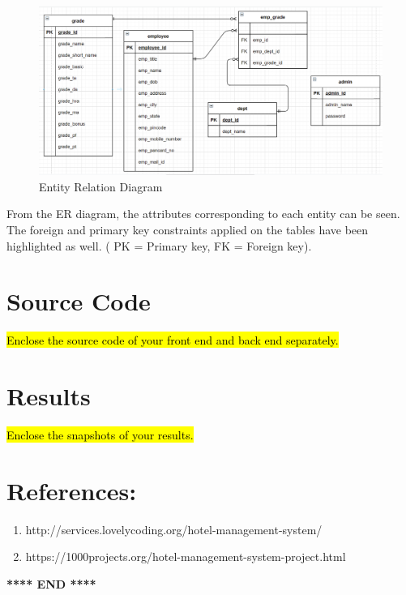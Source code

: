 \documentclass[12pt]{article}
\begin{document}
\begin{figure}[h!]
    \centering
    \includegraphics[width = \columnwidth]{er_diagram.png}
    \caption{Entity Relation Diagram}
    \label{fig:my_label}
\end{figure}
\noindent
From the ER diagram, the attributes corresponding to each entity can be seen. The foreign and primary key constraints applied on the tables have been highlighted as well. ( PK = Primary key, FK = Foreign key).


\newpage                            %
\section{Source Code}               %

\hl{Enclose the source code of your front end and back end separately.}

\newpage            %
\section{Results}   %

\hl{Enclose the snapshots of your results.}

\begin{figure}[h!]
    \centering
\end{figure}

\newpage
\section{References:}
\begin{enumerate}
    \item http://services.lovelycoding.org/hotel-management-system/
    \item https://1000projects.org/hotel-management-system-project.html
\end{enumerate}


\begin{center}
    \textbf{**** END ****}
\end{center}
\end{document}
